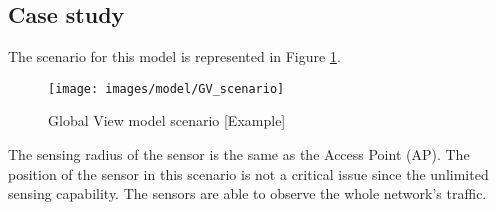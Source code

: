 \subsection{Case study} \label{sec:gv_scenario}
The scenario for this model is represented in Figure \ref{fig:gv_scenario}.

\begin{figure}[h]
	\centering
	\texttt{[image: images/model/GV\_scenario]}
	\caption{Global View model scenario [Example]}
	\label{fig:gv_scenario}
\end{figure}

The sensing radius of the sensor is the same as the Access Point (\acs{AP}). The position of the sensor in this scenario is not a critical issue since the unlimited sensing capability. The sensors are able to observe the whole network's traffic.